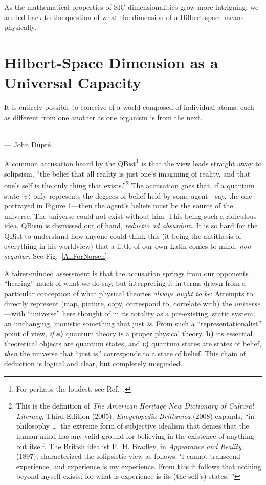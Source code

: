\documentclass[aps,pra,superscriptaddress,10pt,tightenlines,twocolumn,nofootinbib]{revtex4}
\begin{document}
As the mathematical properties of SIC dimensionalities grow more
intriguing, we are led back to the question of what the dimension of a
Hilbert space means physically.

\section{Hilbert-Space Dimension as a Universal Capacity}

\label{HSpaceDim}

\begin{flushright}
\baselineskip=13pt
\parbox{2.8in}{\baselineskip=13pt
\small It is entirely possible to conceive of a world composed of individual atoms, each as different from one another as one organism is from the next.}
\medskip\\
\small --- John Dupr\'e
\end{flushright}

A common accusation heard by the QBist\footnote{For perhaps the loudest, see Ref.\ \cite{Norsen}.} is that the view leads straight away to solipsism, ``the belief that all reality is just one's  imagining of reality, and that one's self is the only thing that exists.''\footnote{This is the definition of {\sl The American Heritage New Dictionary of Cultural Literacy}, Third Edition (2005).  {\sl Encyclopedia Brittanica\/} (2008) expands, ``in philosophy \ldots\ the extreme form of subjective idealism that denies that the human mind has any valid ground for believing in the existence of anything but itself. The British idealist F.~H. Bradley, in {\sl Appearance and Reality\/} (1897), characterized the solipsistic view as follows: `I cannot transcend experience, and experience is my experience. From this it follows that nothing beyond myself exists; for what is experience is its (the self's) states.'$\,$''}  The accusation goes that, if a quantum state $|\psi\rangle$ only represents the degrees of belief held by some agent---say, the one portrayed in Figure 1---then the agent's beliefs must be the source of the universe.  The universe could not exist without him: This being such a ridiculous idea, QBism is dismissed out of hand, {\it reductio ad absurdum}.  It is so hard for the QBist to understand how anyone could think this (it being the antithesis of everything in his worldview) that a little of our own Latin comes to mind: {\it non sequitur}.  See Fig.~\ref{AllForNorsen}.

A fairer-minded assessment is that the accusation springs from our opponents ``hearing'' much of what we do say, but interpreting it in terms drawn from a particular conception of what physical theories {\it always ought to be}:  Attempts to directly represent (map, picture, copy, correspond to, correlate with) the {\it universe}---with ``universe'' here thought of in its totality as a pre-existing, static system; an unchanging, monistic something that just {\it is}.  From such a ``representationalist'' point of view, {\it if\/} {\bf a)} quantum theory is a proper physical theory, {\bf b)} its essential theoretical objects are quantum states, and {\bf c)} quantum states are states of belief, {\it then\/} the universe that ``just is'' corresponds to a state of belief.  This chain of deduction is logical and clear, but completely misguided.
\end{document}
